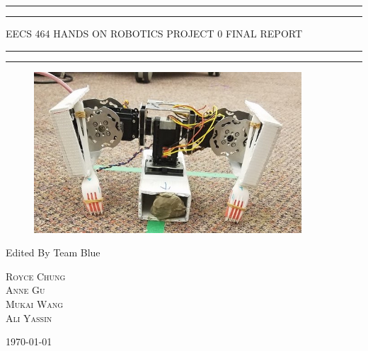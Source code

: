 \documentclass[a4paper, 12pt, oneside]{article} %
\begin{document}
 

\begin{titlepage} %

	\centering %
	
	\scshape %
	
	\vspace*{2\baselineskip} %
	
	
	\rule{\textwidth}{1.6pt}\vspace*{-\baselineskip}\vspace*{2pt} %
	\rule{\textwidth}{0.4pt} %
	
	\vspace{0.75\baselineskip} %
	
	{\LARGE EECS 464 HANDS ON ROBOTICS\vskip 0.2in PROJECT 0 FINAL REPORT} %
	
	\vspace{0.75\baselineskip} %
	
	\rule{\textwidth}{0.4pt}\vspace*{-\baselineskip}\vspace{3.2pt} %
	\rule{\textwidth}{1.6pt} %
	\vspace{3\baselineskip}
	\begin{figure}[htbp]
		\centering
		\includegraphics[width=10cm]{cover.jpg}
	\end{figure}
	\vspace{2\baselineskip} %
	
	
	
	Edited By Team Blue
	
	\vspace{0.5\baselineskip} %
	
	{\scshape\Large Royce Chung \\ Anne Gu \\ Mukai Wang \\ Ali Yassin} %
	
	\vfill

	
	\today
	

	

\end{titlepage}
\end{document}
